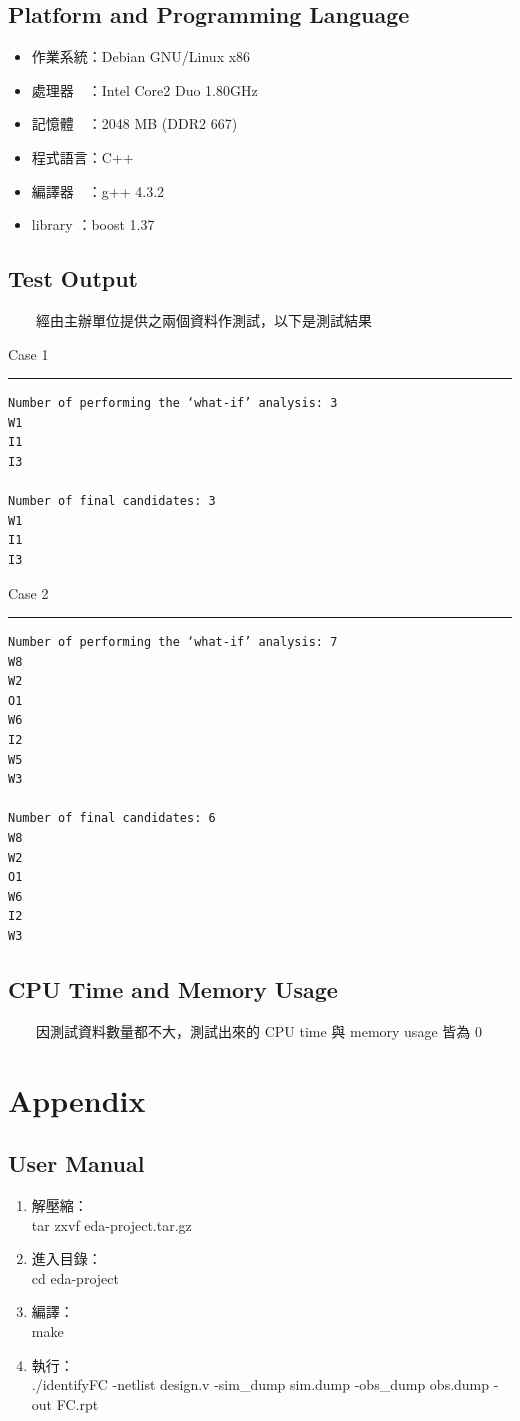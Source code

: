 \documentclass[12pt,a4paper]{article}
\begin{document}
\subsection{Platform and Programming Language}

\begin{itemize}
\item 作業系統：Debian GNU/Linux x86
\item 處理器　：Intel Core2 Duo 1.80GHz
\item 記憶體　：2048 MB (DDR2 667)
\item 程式語言：C++
\item 編譯器　：g++ 4.3.2
\item library ：boost 1.37
\end{itemize}

\subsection{Test Output}

　　經由主辦單位提供之兩個資料作測試，以下是測試結果

Case 1
\hrule
\begin{verbatim}
Number of performing the ‘what-if’ analysis: 3
W1
I1
I3

Number of final candidates: 3
W1
I1
I3
\end{verbatim}

Case 2
\hrule
\begin{verbatim}
Number of performing the ‘what-if’ analysis: 7
W8
W2
O1
W6
I2
W5
W3

Number of final candidates: 6
W8
W2
O1
W6
I2
W3
\end{verbatim}

\subsection{CPU Time and Memory Usage}

　　因測試資料數量都不大，測試出來的 CPU time 與 memory usage 皆為 $0$

\section{Appendix}

\subsection{User Manual}

\begin{enumerate}
\item 解壓縮：\\tar zxvf eda-project.tar.gz
\item 進入目錄：\\cd eda-project
\item 編譯：\\make
\item 執行：\\./identifyFC -netlist design.v -sim\_dump sim.dump -obs\_dump obs.dump -out FC.rpt
\end{enumerate}
\end{document}
